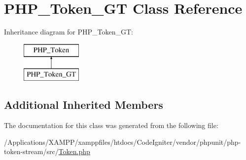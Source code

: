\hypertarget{class_p_h_p___token___g_t}{}\section{P\+H\+P\+\_\+\+Token\+\_\+\+GT Class Reference}
\label{class_p_h_p___token___g_t}
Inheritance diagram for P\+H\+P\+\_\+\+Token\+\_\+\+GT\+:\begin{figure}[H]
\begin{center}
\leavevmode
\includegraphics[height=2.000000cm]{class_p_h_p___token___g_t}
\end{center}
\end{figure}
\subsection*{Additional Inherited Members}


The documentation for this class was generated from the following file\+:\begin{DoxyCompactItemize}
\item 
/\+Applications/\+X\+A\+M\+P\+P/xamppfiles/htdocs/\+Code\+Igniter/vendor/phpunit/php-\/token-\/stream/src/\mbox{\hyperlink{_token_8php}{Token.\+php}}\end{DoxyCompactItemize}
